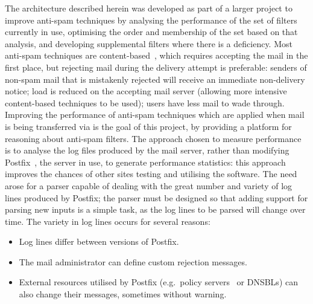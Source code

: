 \documentclass{svmult}
\begin{document}
The architecture described herein was developed as part of a larger project
to improve anti-spam techniques by analysing the performance of the set of
filters currently in use, optimising the order and membership of the set
based on that analysis, and developing supplemental filters where there is
a deficiency.  Most anti-spam techniques are
content-based~\cite{a-plan-for-spam, word-stemming, relaxed-online-svms},
which requires accepting the mail in the first place, but rejecting mail
during the delivery attempt is preferable: senders of non-spam mail that is
mistakenly rejected will receive an immediate non-delivery notice; load is
reduced on the accepting mail server (allowing more intensive content-based
techniques to be used); users have less mail to wade through.  Improving
the performance of anti-spam techniques which are applied when mail is
being transferred via \SMTP{}\footnotemark{} is the goal of this project,
by providing a platform for reasoning about anti-spam filters.  The
approach chosen to measure performance is to analyse the log files produced
by the mail server, rather than modifying Postfix~\cite{postfix}, the
\SMTP{} server in use, to generate performance statistics: this approach
improves the chances of other sites testing and utilising the software.
The need arose for a parser capable of dealing with the great number and
variety of log lines produced by Postfix; the parser must be designed so
that adding support for parsing new inputs is a simple task, as the log
lines to be parsed will change over time.  The variety in log lines occurs
for several reasons:

\begin{itemize}

    \item Log lines differ between versions of Postfix.
        
    \item The mail administrator can define custom rejection
        messages.

    \item External resources utilised by Postfix (e.g.\ policy
        servers~\cite{policy-servers} or DNSBLs) can also change their
        messages, sometimes without warning.

\end{itemize}
\end{document}
